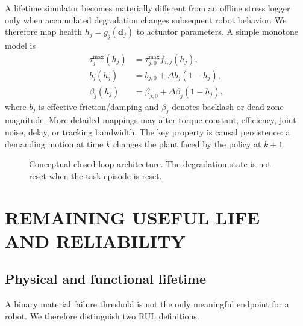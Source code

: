 \documentclass[letterpaper,10pt,conference]{ieeeconf}
\begin{document}
A lifetime simulator becomes materially different from an offline stress logger only when accumulated degradation changes subsequent robot behavior. We therefore map health $h_j=g_j(\mathbf{d}_j)$ to actuator parameters. A simple monotone model is
\begin{align}
\tau^{\max}_j(h_j) &= \tau^{\max}_{j,0} f_{\tau,j}(h_j), \\
b_j(h_j) &= b_{j,0}+\Delta b_j(1-h_j), \\
\beta_j(h_j) &= \beta_{j,0}+\Delta\beta_j(1-h_j),
\label{eq:evolvingplant}
\end{align}
where $b_j$ is effective friction/damping and $\beta_j$ denotes backlash or dead-zone magnitude. More detailed mappings may alter torque constant, efficiency, joint noise, delay, or tracking bandwidth. The key property is causal persistence: a demanding motion at time $k$ changes the plant faced by the policy at $k+1$.

\begin{figure}[t]
\centering
{}
\caption{Conceptual closed-loop architecture. The degradation state is not reset when the task episode is reset.}
\label{fig:pipeline}
\end{figure}

\section{REMAINING USEFUL LIFE AND RELIABILITY}

\subsection{Physical and functional lifetime}

A binary material failure threshold is not the only meaningful endpoint for a robot. We therefore distinguish two RUL definitions.
\end{document}
